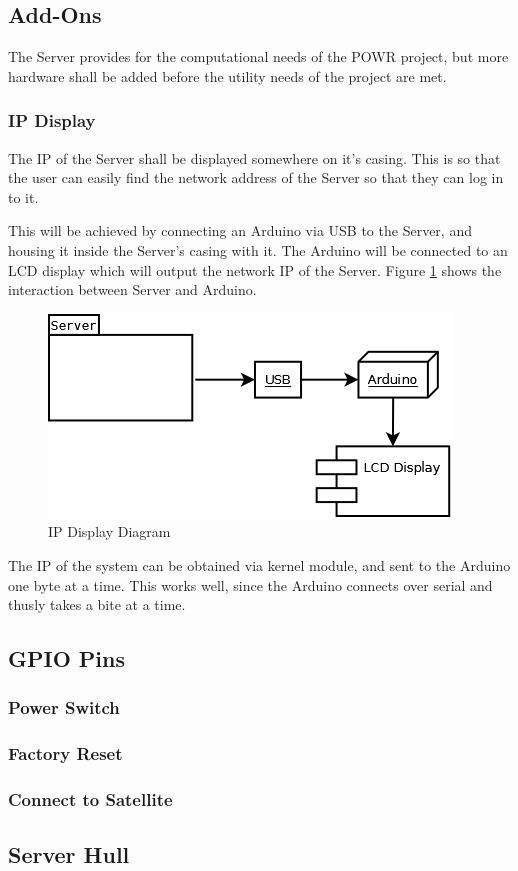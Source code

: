 
\subsection{Add-Ons}
The Server provides for the computational needs of the POW\-R project, but
more hardware shall be added before the utility needs of the project are met.

\subsubsection{IP Display}
The IP of the Server shall be displayed somewhere on it's casing. This is so that
the user can easily find the network address of the Server so that they can log in
to it.

This will be achieved by connecting an Arduino via USB to the Server, and housing it 
inside the Server's casing with it. The Arduino will be connected to an LCD display
which will output the network IP of the Server. Figure \ref{ArduinoLCD} shows
the interaction between Server and Arduino.

\begin{figure}
\centering
\includegraphics[scale=0.5]{Hardware/images/ArduinoLCD.png}
\caption{IP Display Diagram}
\label{ArduinoLCD}
\end{figure}

The IP of the system can be obtained via kernel module, and sent to the Arduino
one byte at a time. This works well, since the Arduino connects over serial and
thusly takes a bite at a time.


\subsection{GPIO Pins}

\subsubsection{Power Switch}

\subsubsection{Factory Reset}

\subsubsection{Connect to Satellite}

\subsection{Server Hull}


